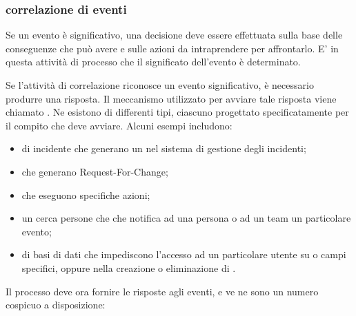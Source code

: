 \subsubsection[Correlazione di eventi]{correlazione di eventi}
Se un evento è significativo, una decisione deve essere effettuata sulla base delle conseguenze che può avere e sulle azioni da intraprendere per affrontarlo. E' in questa attività di processo che il significato dell'evento è determinato.

Se l'attività di correlazione riconosce un evento significativo, è necessario produrre una risposta. Il meccanismo utilizzato per avviare tale risposta viene chiamato . Ne esistono di differenti tipi, ciascuno progettato specificatamente per il compito che deve avviare. Alcuni esempi includono:

\begin{itemize}
\item{ di incidente che generano un  nel sistema di gestione degli incidenti;}
\item{ che generano \ac{Request-For-Change};}
\item{ che eseguono specifiche azioni;}
\item{un cerca persone che che notifica ad una persona o ad un team un particolare evento;}
\item{ di basi di dati che impediscono l'accesso ad un particolare utente su  o campi specifici, oppure nella creazione o eliminazione di .}
\end{itemize}

Il processo deve ora fornire le risposte agli eventi, e ve ne sono un numero cospicuo a disposizione:

